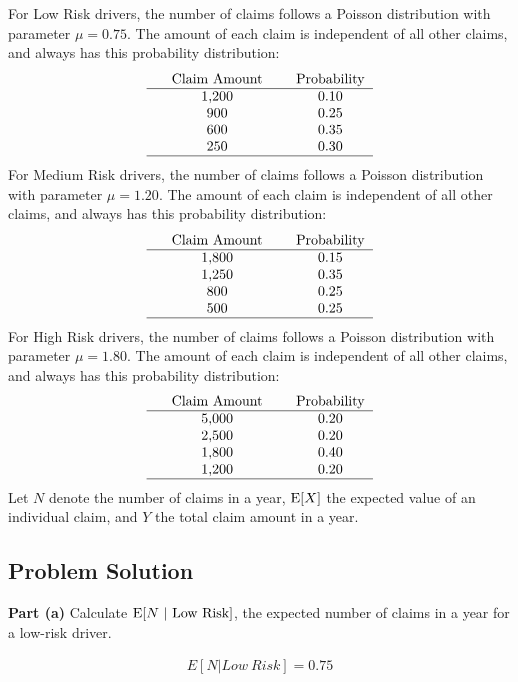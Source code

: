 \documentclass[12pt]{article}
\theoremstyle{definition}
\begin{document}
\bigskip
For Low Risk drivers, the number of claims follows a Poisson distribution with parameter $\mu = 0.75$. The amount of each claim is independent of all other claims, and always has this probability distribution:
$$
\begin{tabular}{ccccc}
& Claim Amount & & Probability\\
\hline
& 1,200 & & 0.10\\
& 900 & & 0.25 \\
& 600 & & 0.35 \\
& 250 & & 0.30 \\
\hline
\end{tabular}
$$
For Medium Risk drivers, the number of claims follows a Poisson distribution with parameter $\mu = 1.20$. The amount of each claim is independent of all other claims, and always has this probability distribution:
$$
\begin{tabular}{ccccc}
& Claim Amount & & Probability\\
\hline
& 1,800 & & 0.15\\
& 1,250 & & 0.35 \\
& 800 & & 0.25 \\
& 500 & & 0.25 \\
\hline
\end{tabular}
$$
For High Risk drivers, the number of claims follows a Poisson distribution with parameter $\mu = 1.80$. The amount of each claim is independent of all other claims, and always has this probability distribution:
$$
\begin{tabular}{ccccc}
& Claim Amount & & Probability\\
\hline
& 5,000 & & 0.20\\
& 2,500 & & 0.20 \\
& 1,800 & & 0.40 \\
& 1,200 & & 0.20 \\
\hline
\end{tabular}
$$
Let $N$ denote the number of claims in a year, $\hbox{E}[X]$ the expected value of an individual claim, and $Y$ the total claim amount in a year.

\newpage
\subsection*{Problem Solution}

\bigskip
\noindent
{\bf Part (a)} Calculate $\hbox{E}[N\ |\ \hbox{Low Risk}]$, the expected number of claims in a year for a low-risk driver.

\begin{align*}
E[N|Low\ Risk] = 0.75
\end{align*}
\end{document}

